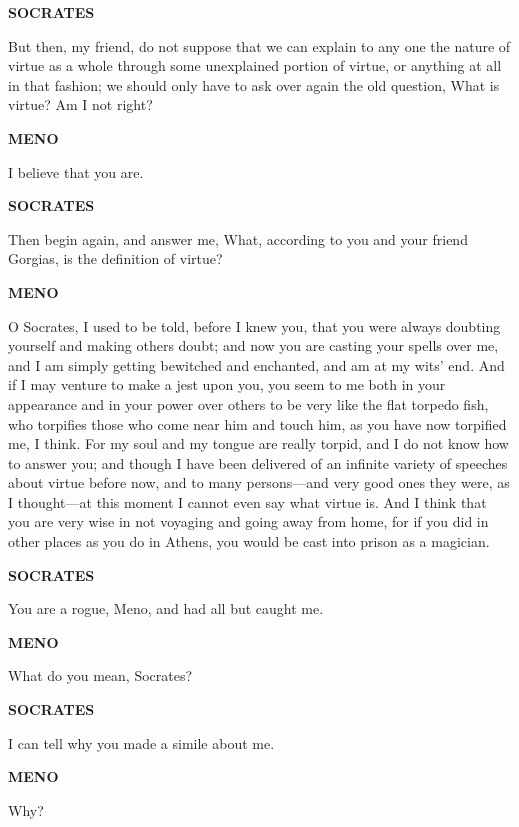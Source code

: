 \documentclass[11pt,letter]{article}
\begin{document}
\par \textbf{SOCRATES}
\par   But then, my friend, do not suppose that we can explain to any one the nature of virtue as a whole through some unexplained portion of virtue, or anything at all in that fashion; we should only have to ask over again the old question, What is virtue? Am I not right?

\par \textbf{MENO}
\par   I believe that you are.

\par \textbf{SOCRATES}
\par   Then begin again, and answer me, What, according to you and your friend Gorgias, is the definition of virtue?

\par \textbf{MENO}
\par   O Socrates, I used to be told, before I knew you, that you were always doubting yourself and making others doubt; and now you are casting your spells over me, and I am simply getting bewitched and enchanted, and am at my wits' end. And if I may venture to make a jest upon you, you seem to me both in your appearance and in your power over others to be very like the flat torpedo fish, who torpifies those who come near him and touch him, as you have now torpified me, I think. For my soul and my tongue are really torpid, and I do not know how to answer you; and though I have been delivered of an infinite variety of speeches about virtue before now, and to many persons—and very good ones they were, as I thought—at this moment I cannot even say what virtue is. And I think that you are very wise in not voyaging and going away from home, for if you did in other places as you do in Athens, you would be cast into prison as a magician.

\par \textbf{SOCRATES}
\par   You are a rogue, Meno, and had all but caught me.

\par \textbf{MENO}
\par   What do you mean, Socrates?

\par \textbf{SOCRATES}
\par   I can tell why you made a simile about me.

\par \textbf{MENO}
\par   Why?
\end{document}
